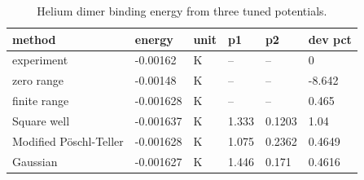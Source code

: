 \begin{table}[htbp]
\centering
\small
\caption{Helium dimer binding energy from three tuned potentials.}
\label{tab:helium}
\begin{tabular}{llllll}
\hline
method & energy & unit & p1 & p2 & dev pct \\
\hline
experiment & -0.00162 & K & -- & -- & 0\\
zero range & -0.00148 & K & -- & -- & -8.642\\
finite range & -0.001628 & K & -- & -- & 0.465\\
Square well & -0.001637 & K & 1.333 & 0.1203 & 1.04\\
Modified Pöschl-Teller & -0.001628 & K & 1.075 & 0.2362 & 0.4649\\
Gaussian & -0.001627 & K & 1.446 & 0.171 & 0.4616 \\
\hline
\end{tabular}
\end{table}
